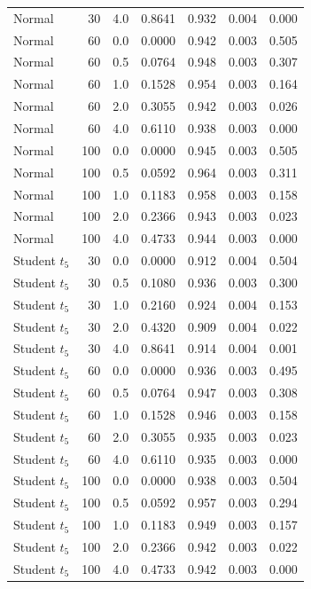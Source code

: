 \documentclass[11pt]{article}
\theoremstyle{remark}
\begin{document}
\begin{longtable}{lrrrrrr}
Normal & 30 & 4.0 & 0.8641 & 0.932 & 0.004 & 0.000 \\
Normal & 60 & 0.0 & 0.0000 & 0.942 & 0.003 & 0.505 \\
Normal & 60 & 0.5 & 0.0764 & 0.948 & 0.003 & 0.307 \\
Normal & 60 & 1.0 & 0.1528 & 0.954 & 0.003 & 0.164 \\
Normal & 60 & 2.0 & 0.3055 & 0.942 & 0.003 & 0.026 \\
Normal & 60 & 4.0 & 0.6110 & 0.938 & 0.003 & 0.000 \\
Normal & 100 & 0.0 & 0.0000 & 0.945 & 0.003 & 0.505 \\
Normal & 100 & 0.5 & 0.0592 & 0.964 & 0.003 & 0.311 \\
Normal & 100 & 1.0 & 0.1183 & 0.958 & 0.003 & 0.158 \\
Normal & 100 & 2.0 & 0.2366 & 0.943 & 0.003 & 0.023 \\
Normal & 100 & 4.0 & 0.4733 & 0.944 & 0.003 & 0.000 \\
Student $t_5$ & 30 & 0.0 & 0.0000 & 0.912 & 0.004 & 0.504 \\
Student $t_5$ & 30 & 0.5 & 0.1080 & 0.936 & 0.003 & 0.300 \\
Student $t_5$ & 30 & 1.0 & 0.2160 & 0.924 & 0.004 & 0.153 \\
Student $t_5$ & 30 & 2.0 & 0.4320 & 0.909 & 0.004 & 0.022 \\
Student $t_5$ & 30 & 4.0 & 0.8641 & 0.914 & 0.004 & 0.001 \\
Student $t_5$ & 60 & 0.0 & 0.0000 & 0.936 & 0.003 & 0.495 \\
Student $t_5$ & 60 & 0.5 & 0.0764 & 0.947 & 0.003 & 0.308 \\
Student $t_5$ & 60 & 1.0 & 0.1528 & 0.946 & 0.003 & 0.158 \\
Student $t_5$ & 60 & 2.0 & 0.3055 & 0.935 & 0.003 & 0.023 \\
Student $t_5$ & 60 & 4.0 & 0.6110 & 0.935 & 0.003 & 0.000 \\
Student $t_5$ & 100 & 0.0 & 0.0000 & 0.938 & 0.003 & 0.504 \\
Student $t_5$ & 100 & 0.5 & 0.0592 & 0.957 & 0.003 & 0.294 \\
Student $t_5$ & 100 & 1.0 & 0.1183 & 0.949 & 0.003 & 0.157 \\
Student $t_5$ & 100 & 2.0 & 0.2366 & 0.942 & 0.003 & 0.022 \\
Student $t_5$ & 100 & 4.0 & 0.4733 & 0.942 & 0.003 & 0.000 \\
\end{longtable}
\end{document}
